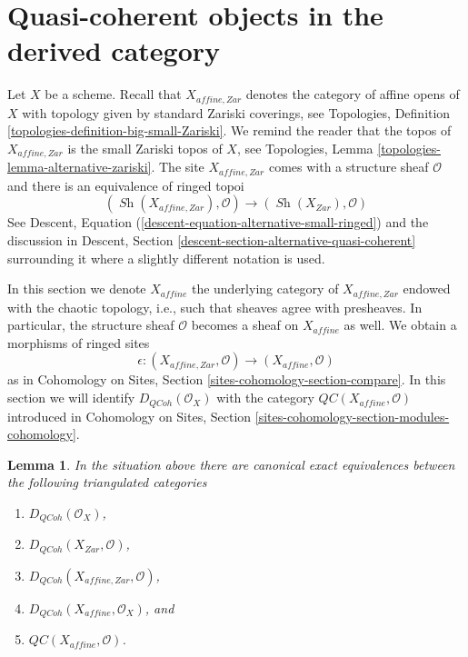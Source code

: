 \documentclass{stacks-project}
\theoremstyle{plain}
\newtheorem{lemma}[subsection]{Lemma}
\theoremstyle{definition}
\theoremstyle{remark}
\numberwithin{equation}{subsection}
\def\Sh{\mathop{\mathit{Sh}}\nolimits}
\def\QCoh{\mathit{QCoh}}
\begin{document}
\section{Quasi-coherent objects in the derived category}
\label{section-QC}

\noindent
Let $X$ be a scheme. Recall that $X_{affine, Zar}$
denotes the category of affine opens of $X$ with topology given
by standard Zariski coverings, see
Topologies, Definition \ref{topologies-definition-big-small-Zariski}.
We remind the reader that the topos of $X_{affine, Zar}$
is the small Zariski topos of $X$, see Topologies, Lemma
\ref{topologies-lemma-alternative-zariski}. The site $X_{affine, Zar}$
comes with a structure sheaf $\mathcal{O}$ and there is an
equivalence of ringed topoi
$$
(\Sh(X_{affine, Zar}), \mathcal{O})
\longrightarrow
(\Sh(X_{Zar}), \mathcal{O})
$$
See Descent, Equation (\ref{descent-equation-alternative-small-ringed})
and the discussion in
Descent, Section \ref{descent-section-alternative-quasi-coherent}
surrounding it where a slightly different notation is used.

\medskip\noindent
In this section we denote $X_{affine}$ the underlying category of
$X_{affine, Zar}$ endowed with the chaotic topology, i.e., such that sheaves
agree with presheaves. In particular, the structure sheaf $\mathcal{O}$
becomes a sheaf on $X_{affine}$ as well.
We obtain a morphisms of ringed sites
$$
\epsilon :
(X_{affine, Zar}, \mathcal{O})
\longrightarrow
(X_{affine}, \mathcal{O})
$$
as in Cohomology on Sites, Section \ref{sites-cohomology-section-compare}.
In this section we will identify $D_\QCoh(\mathcal{O}_X)$ with
the category $\mathit{QC}(X_{affine}, \mathcal{O})$ introduced in
Cohomology on Sites, Section \ref{sites-cohomology-section-modules-cohomology}.

\begin{lemma}
\label{lemma-DQCoh-alternative-small}
In the situation above there are canonical exact equivalences between
the following triangulated categories
\begin{enumerate}
\item $D_\QCoh(\mathcal{O}_X)$,
\item $D_\QCoh(X_{Zar}, \mathcal{O})$,
\item $D_\QCoh(X_{affine, Zar}, \mathcal{O})$,
\item $D_\QCoh(X_{affine}, \mathcal{O}_X)$, and
\item $\mathit{QC}(X_{affine}, \mathcal{O})$.
\end{enumerate}
\end{lemma}
\end{document}
